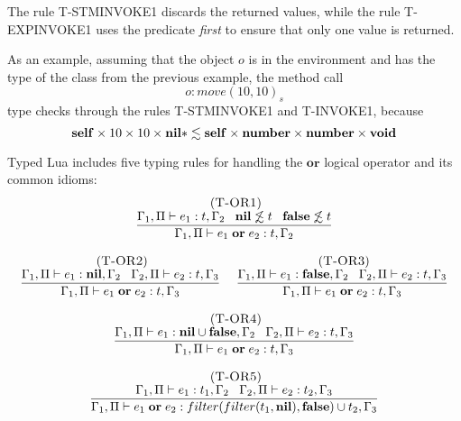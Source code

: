 The rule \textsc{T-STMINVOKE1} discards the returned values,
while the rule \textsc{T-EXPINVOKE1} uses the predicate \emph{first} to
ensure that only one value is returned.

As an example, assuming that the object $o$ is in the environment and
has the type of the class from the previous example, the method call
\[
o{:}move(10, 10)_{s}
\]
type checks through the rules \textsc{T-STMINVOKE1} and \textsc{T-INVOKE1},
because
\[
\mathbf{self} \times 10 \times 10 \times \mathbf{nil}{*} \lesssim \mathbf{self} \times \mathbf{number} \times \mathbf{number} \times \mathbf{void}
\]

Typed Lua includes five typing rules for handling the $\mathbf{or}$
logical operator and its common idioms:
\[
\begin{array}{c}
\begin{array}{c}
\; (\textsc{T-OR1})\\
\dfrac{\Gamma_{1}, \Pi \vdash e_{1}:t, \Gamma_{2} \;\;\;
       \mathbf{nil} \not\lesssim t \;\;\;
       \mathbf{false} \not\lesssim t}
      {\Gamma_{1}, \Pi \vdash e_{1} \; \mathbf{or} \; e_{2}:t, \Gamma_{2}}
\end{array}
\\ \\
\begin{array}{c}
\; (\textsc{T-OR2})\\
\dfrac{\Gamma_{1}, \Pi \vdash e_{1}:\mathbf{nil}, \Gamma_{2} \;\;\;
       \Gamma_{2}, \Pi \vdash e_{2}:t, \Gamma_{3}}
      {\Gamma_{1}, \Pi \vdash e_{1} \; \mathbf{or} \; e_{2}:t, \Gamma_{3}}
\end{array}
\;
\begin{array}{c}
\; (\textsc{T-OR3})\\
\dfrac{\Gamma_{1}, \Pi \vdash e_{1}:\mathbf{false}, \Gamma_{2} \;\;\;
       \Gamma_{2}, \Pi \vdash e_{2}:t, \Gamma_{3}}
      {\Gamma_{1}, \Pi \vdash e_{1} \; \mathbf{or} \; e_{2}:t, \Gamma_{3}}
\end{array}
\\ \\
\begin{array}{c}
\; (\textsc{T-OR4})\\
\dfrac{\Gamma_{1}, \Pi \vdash e_{1}:\mathbf{nil} \cup \mathbf{false}, \Gamma_{2} \;\;\;
       \Gamma_{2}, \Pi \vdash e_{2}:t, \Gamma_{3}}
      {\Gamma_{1}, \Pi \vdash e_{1} \; \mathbf{or} \; e_{2}:t, \Gamma_{3}}
\end{array}
\\ \\
\begin{array}{c}
\; (\textsc{T-OR5})\\
\dfrac{\Gamma_{1}, \Pi \vdash e_{1}:t_{1}, \Gamma_{2} \;\;\;
       \Gamma_{2}, \Pi \vdash e_{2}:t_{2}, \Gamma_{3}}
      {\Gamma_{1}, \Pi \vdash e_{1} \; \mathbf{or} \; e_{2}:filter(filter(t_{1}, \mathbf{nil}), \mathbf{false}) \cup t_{2}, \Gamma_{3}}
\end{array}
\end{array}
\]

